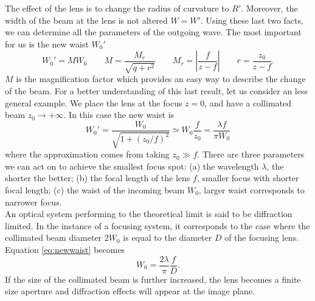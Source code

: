 The effect of the lens is to change the radius of curvature to $R'$. Moreover, the width of the beam at the lens is not altered $W=W'$. Using these last two facts, we can determine all the parameters of the outgoing wave. The most important for us is the new waist $W_0'$
\begin{equation}
W_0' = MW_0 \qquad M = \frac{M_r}{\sqrt{q+r^2}} \qquad M_r = \left|\frac{f}{z-f}\right| \qquad r = \frac{z_0}{z-f}.
\end{equation}
$M$ is the magnification factor which provides an easy way to describe the change of the beam. For a better understanding of this last result, let us consider an less general example. We place the lens at the focus $z=0$, and have a collimated beam $z_0 \to +\infty $. In this case the new waist is
\begin{equation}
\label{eq:newwaist}
W_0' = \frac{W_0}{\sqrt{1 + (z_0/f)^2}} \simeq W_0\frac{f}{z_0} = \frac{\lambda f}{\pi W_0}
\end{equation}
where the approximation comes from taking $z_0\gg f$. There are three parameters we can act on to achieve the smallest focus spot: (a) the wavelength $\lambda$, the shorter the better; (b) the focal length of the lens $f$, smaller focus with shorter focal length; (c) the waist of the incoming beam $W_0$, larger waist corresponds to narrower focus.\\
An optical system performing to the theoretical limit is said to be diffraction limited. In the instance of a focusing system, it corresponds to the case where the collimated beam diameter $2W_0$ is equal to the diameter $D$ of the focusing lens. Equation \ref{eq:newwaist} becomes
\begin{equation}
W_0 = \frac{2\lambda}{\pi} \frac{f}{D}.
\end{equation}
If the size of the collimated beam is further increased, the lens becomes a finite size aperture and diffraction effects will appear at the image plane.

